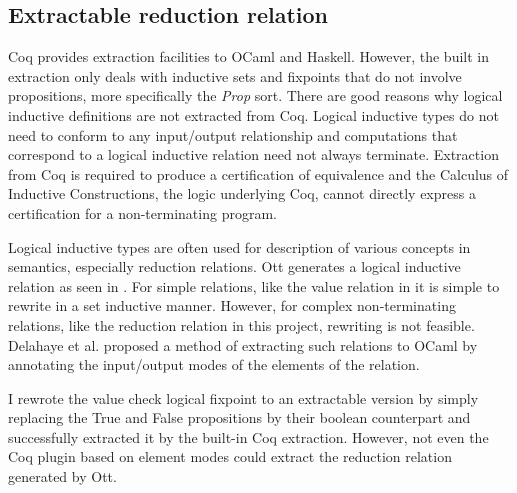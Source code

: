\documentclass[12pt,twoside,notitlepage]{report}
\begin{document}
\subsection{Extractable reduction relation}
Coq provides extraction facilities to OCaml and Haskell. However, the built in extraction only deals with inductive sets and fixpoints that do not involve propositions, more specifically the \textit{Prop} sort. There are good reasons why logical inductive definitions are not extracted from Coq. Logical inductive types do not need to conform to any input/output relationship and computations that correspond to a logical inductive relation need not always terminate. Extraction from Coq is required to produce a certification of equivalence and the Calculus of Inductive Constructions, the logic underlying Coq, cannot directly express a certification for a non-terminating program. 


Logical inductive types are often used for description of various concepts in semantics, especially reduction relations. Ott generates a logical inductive relation as seen in . For simple relations, like the value relation in  it is simple to rewrite in a set inductive manner. However, for complex non-terminating relations, like the reduction relation in this project, rewriting is not feasible.  Delahaye et al.\cite{delahaye2007extracting,tollitte2012producing} proposed a method of extracting such relations to OCaml by annotating the input/output modes of the elements of the relation. 

I rewrote the value check logical fixpoint to an extractable version by simply replacing the True and False propositions by their boolean counterpart and successfully extracted it by the built-in Coq extraction. However, not even the Coq plugin based on element modes could extract the reduction relation generated by Ott. 
\end{document}
